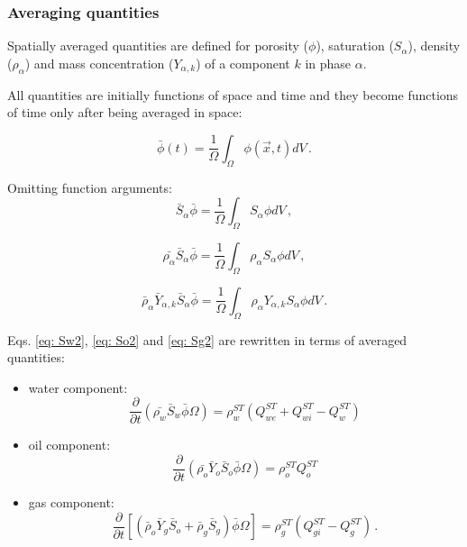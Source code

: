 \documentclass[final,authoryear,5p,times,twocolumn,10pt]{elsarticle}
\begin{document}
\subsubsection{Averaging quantities}

Spatially averaged quantities are defined for porosity ($\phi$), saturation ($S_\alpha$), density ($\rho_\alpha$) and mass concentration ($Y_{\alpha,k}$) of a component $k$ in phase $\alpha$.

All quantities are initially functions of space and time and they become functions of time only after being averaged in space:

\begin{equation}
\bar{\phi} (t) = \frac{1}{\Omega}\int_{\Omega}\phi \left(\vec{x},t\right) dV \, .
\end{equation}

Omitting function arguments:
\begin{equation}
\bar{S}_\alpha\bar{\phi} = \frac{1}{\Omega}\int_{\Omega}S_\alpha \phi dV \, ,
\end{equation}

\begin{equation}
\bar{\rho_\alpha}\bar{S}_\alpha \bar{\phi} = \frac{1}{\Omega}\int_{\Omega}\rho_\alpha S_\alpha \phi dV \, ,
\end{equation}

\begin{equation}
\bar{\rho}_\alpha \bar{Y}_{\alpha,k}\bar{S}_\alpha \bar{\phi} = \frac{1}{\Omega}\int_{\Omega}\rho_\alpha Y_{\alpha,k} S_\alpha \phi dV \, .
\end{equation}

Eqs. \eqref{eq: Sw2}, \eqref{eq: So2} and \eqref{eq: Sg2} are rewritten in terms of averaged quantities:

\begin{itemize}
\item water component:
\begin{equation}\label{eq: Sw3}
\frac{\partial}{\partial t} \left( \bar{\rho_w}\bar{S}_w\bar{\phi} \Omega \right) = \rho_w^{ST}\left(Q_{we}^{ST} + Q_{wi}^{ST}-Q_w^{ST}\right)
\end{equation}

\item oil component:
\begin{equation}\label{eq: So3}
\frac{\partial}{\partial t} \left( \bar{\rho_o}\bar{Y}_o\bar{S}_o\bar{\phi} \Omega \right) = \rho_o^{ST}Q_o^{ST}
\end{equation}

\item gas component:
\begin{equation}\label{eq: Sg3}
\frac{\partial}{\partial t} \left[\left( \bar{\rho}_o\bar{Y}_g \bar{S}_o + \bar{\rho}_g \bar{S}_g \right) \bar{\phi} \Omega\right] =  \rho_g^{ST}(Q_{gi}^{ST}-Q_g^{ST}) \, .
\end{equation}
\end{itemize}
\end{document}
